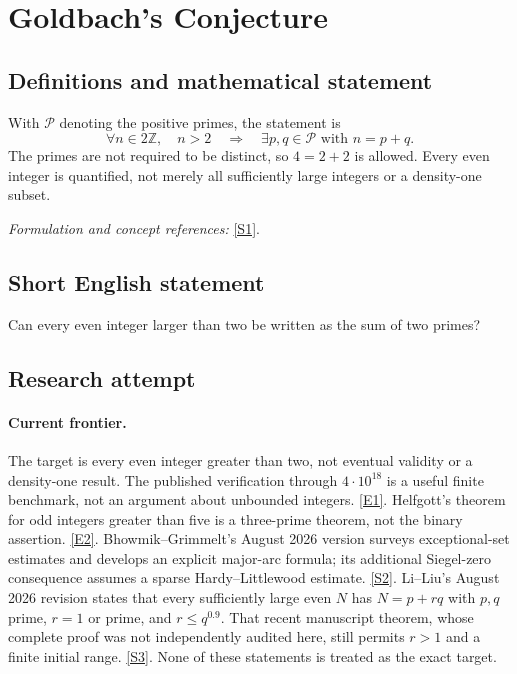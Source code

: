 \documentclass[11pt,a4paper]{article}
\newcommand{\Z}{\mathbb{Z}}
\newcommand{\sref}[2]{\hyperlink{source:#1:#2}{[S#2]}}
\newcommand{\eref}[2]{\hyperlink{extra:#1:#2}{[E#2]}}
\newif\ifshowcatalogue
\newcommand{\cataloguescope}[1]{\ifshowcatalogue
 \paragraph{Exact scope in the supplied catalogue.}
 \begin{quote}\small #1\end{quote}\fi}
\numberwithin{equation}{section}
\begin{document}
\setcounter{section}{0}
\clearpage
\section*{\texorpdfstring{Goldbach's Conjecture}{Goldbach's Conjecture}}\label{statement}
\subsection{Definitions and mathematical statement}
With $\mathcal P$ denoting the positive primes, the statement is
\[
 \forall n\in2\Z,\quad n>2\quad\Longrightarrow\quad
 \exists p,q\in\mathcal P\text{ with }n=p+q.
\]
The primes are not required to be distinct, so $4=2+2$ is allowed. Every even integer is quantified, not merely all sufficiently large integers or a density-one subset.
\par\smallskip\textit{Formulation and concept references:} \sref{statement}{1}.
\cataloguescope{Prove or disprove that every even integer n greater than 2 is the sum of two primes.}
\subsection{Short English statement}
Can every even integer larger than two be written as the sum of two primes?
\subsection{Research attempt}

\paragraph{Current frontier.}
The target is every even integer greater than two, not eventual validity
or a density-one result. The published verification through $4\cdot10^{18}$
is a useful finite benchmark, not an argument about unbounded integers.
\eref{statement}{1}. Helfgott's theorem for odd integers greater than five is a
three-prime theorem, not the binary assertion. \eref{statement}{2}.
Bhowmik--Grimmelt's August 2026 version surveys exceptional-set estimates
and develops an explicit major-arc formula; its additional Siegel-zero
consequence assumes a sparse Hardy--Littlewood estimate. \sref{statement}{2}.
Li--Liu's August 2026 revision states that every sufficiently large even
$N$ has $N=p+rq$ with $p,q$ prime, $r=1$ or prime, and $r\le q^{0.9}$.
That recent manuscript theorem, whose complete proof was not independently
audited here, still permits $r>1$ and a finite initial range.
\sref{statement}{3}. None of these statements is treated as the exact target.
\end{document}

